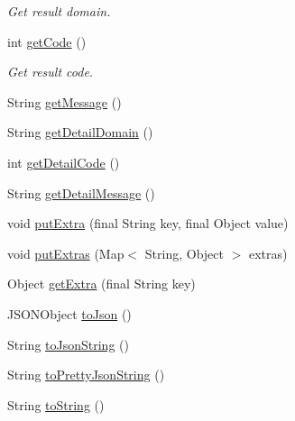 \begin{DoxyCompactItemize}
\begin{DoxyCompactList}\small\item\em Get result domain. \end{DoxyCompactList}\item 
int \hyperlink{classcom_1_1toast_1_1android_1_1gamebase_1_1base_1_1_gamebase_exception_a8361b009dd85dd991e5e684d648ffabf}{get\+Code} ()
\begin{DoxyCompactList}\small\item\em Get result code. \end{DoxyCompactList}\item 
String \hyperlink{classcom_1_1toast_1_1android_1_1gamebase_1_1base_1_1_gamebase_exception_afafd068b736520af1e24269a284980a9}{get\+Message} ()
\item 
String \hyperlink{classcom_1_1toast_1_1android_1_1gamebase_1_1base_1_1_gamebase_exception_ab0c945b0986046152a180b912283119c}{get\+Detail\+Domain} ()
\item 
int \hyperlink{classcom_1_1toast_1_1android_1_1gamebase_1_1base_1_1_gamebase_exception_a92a64f56cf7dcfbe8f00fc7cb21d3ca6}{get\+Detail\+Code} ()
\item 
String \hyperlink{classcom_1_1toast_1_1android_1_1gamebase_1_1base_1_1_gamebase_exception_adebaece1bb2dc604e1c5e77d66a43628}{get\+Detail\+Message} ()
\item 
void \hyperlink{classcom_1_1toast_1_1android_1_1gamebase_1_1base_1_1_gamebase_exception_abed433372a6514de9436aa90cc4b156c}{put\+Extra} (final String key, final Object value)
\item 
void \hyperlink{classcom_1_1toast_1_1android_1_1gamebase_1_1base_1_1_gamebase_exception_a4c2f908275e5fc56081aabb2f71a50e7}{put\+Extras} (Map$<$ String, Object $>$ extras)
\item 
Object \hyperlink{classcom_1_1toast_1_1android_1_1gamebase_1_1base_1_1_gamebase_exception_a746ab6b4e7c3bb90ca7230a40197bb4b}{get\+Extra} (final String key)
\item 
J\+S\+O\+N\+Object \hyperlink{classcom_1_1toast_1_1android_1_1gamebase_1_1base_1_1_gamebase_exception_a6b2a39146828e6b135949df810b8e052}{to\+Json} ()
\item 
String \hyperlink{classcom_1_1toast_1_1android_1_1gamebase_1_1base_1_1_gamebase_exception_a58acf6402880e9769d79d8667581fa6a}{to\+Json\+String} ()
\item 
String \hyperlink{classcom_1_1toast_1_1android_1_1gamebase_1_1base_1_1_gamebase_exception_a054431f3d988a22295cfc8b784ff2637}{to\+Pretty\+Json\+String} ()
\item 
String \hyperlink{classcom_1_1toast_1_1android_1_1gamebase_1_1base_1_1_gamebase_exception_ad146fa8579a5f8a876c4688cc5a68520}{to\+String} ()
\end{DoxyCompactItemize}
